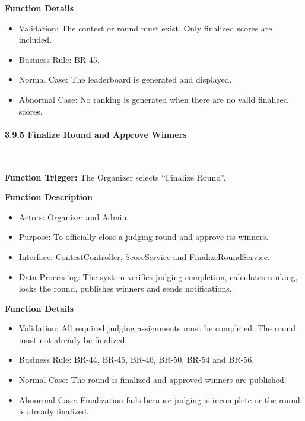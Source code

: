 \textbf{Function Details}
\begin{itemize}[leftmargin=1.5em, nosep]
    \item Validation: The contest or round must exist. Only finalized scores are included.
    \item Business Rule: BR-45.
    \item Normal Case: The leaderboard is generated and displayed.
    \item Abnormal Case: No ranking is generated when there are no valid finalized scores.
\end{itemize}

\paragraph*{3.9.5 Finalize Round and Approve Winners}\leavevmode\\[-0.5em]
\label{par:finalize-round-approve-winners}

\textbf{Function Trigger:} The Organizer selects ``Finalize Round''.

\textbf{Function Description}
\begin{itemize}[leftmargin=1.5em, nosep]
    \item Actors: Organizer and Admin.
    \item Purpose: To officially close a judging round and approve its winners.
    \item Interface: ContestController, ScoreService and FinalizeRoundService.
    \item Data Processing: The system verifies judging completion, calculates ranking, locks the round, publishes winners and sends notifications.
\end{itemize}

\textbf{Function Details}
\begin{itemize}[leftmargin=1.5em, nosep]
    \item Validation: All required judging assignments must be completed. The round must not already be finalized.
    \item Business Rule: BR-44, BR-45, BR-46, BR-50, BR-54 and BR-56.
    \item Normal Case: The round is finalized and approved winners are published.
    \item Abnormal Case: Finalization fails because judging is incomplete or the round is already finalized.
\end{itemize}

